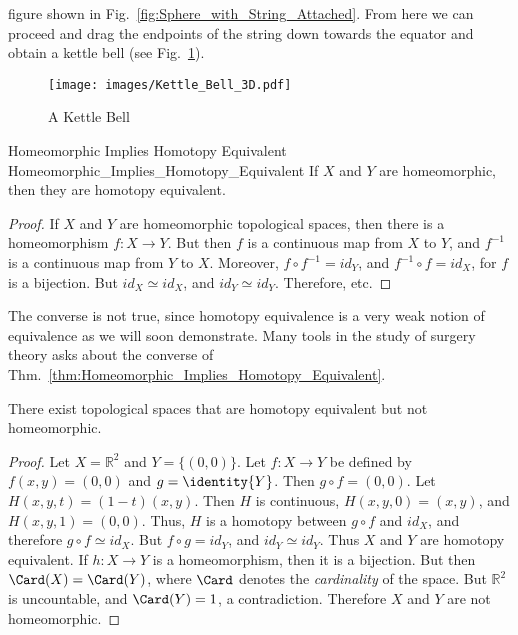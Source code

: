 \documentclass{article}                                                        %
\begin{document}
        figure shown in Fig.~\ref{fig:Sphere_with_String_Attached}. From here we
        can proceed and drag the endpoints of the string down towards the
        equator and obtain a kettle bell (see Fig.~\ref{fig:Kettle_Bell}).
        \begin{figure}[H]
            \centering
            \captionsetup{type=figure}
            \texttt{[image: images/Kettle\_Bell\_3D.pdf]}
            \caption{A Kettle Bell}
            \label{fig:Kettle_Bell}
        \end{figure}
        \clearpage
        \begin{ltheorem}{Homeomorphic Implies Homotopy Equivalent}
                        {Homeomorphic_Implies_Homotopy_Equivalent}
            If $X$ and $Y$ are homeomorphic, then they are homotopy equivalent.
        \end{ltheorem}
        \begin{proof}
            If $X$ and $Y$ are homeomorphic topological spaces, then there
            is a homeomorphism $f:X\rightarrow Y$. But then $f$ is a
            continuous map from $X$ to $Y$, and $f^{-1}$ is a continuous
            map from $Y$ to $X$. Moreover, ${f}\circ{f^{-1}}=id_{Y}$, and
            ${f^{-1}}\circ{f}=id_{X}$, for $f$ is a bijection. But
            ${id_{X}}\simeq{id_{X}}$, and ${id_{Y}}\simeq{id_{Y}}$.
            Therefore, etc.
        \end{proof}
        The converse is not true, since homotopy equivalence is a very weak
        notion of equivalence as we will soon demonstrate. Many tools in the
        study of surgery theory asks about the converse of
        Thm.~\ref{thm:Homeomorphic_Implies_Homotopy_Equivalent}.
        \begin{theorem}
            \label{thm:homotopic_does_not_imply_homeomorphic}%
            There exist topological spaces that are homotopy equivalent but not
            homeomorphic.
        \end{theorem}
        \begin{proof}
            Let $X=\mathbb{R}^{2}$ and $Y=\{(0,0)\}$. Let $f:{X}\rightarrow{Y}$
            be defined by $f(x,y)=(0,0)$ and $g=\identity{Y}$. Then
            $g\circ{f}=(0,0)$. Let $H(x,y,t)=(1-t)(x,y)$.
            Then $H$ is continuous, $H(x,y,0)=(x,y)$,
            and $H(x,y,1)=(0,0)$. Thus, $H$ is a
            homotopy between ${g}\circ{f}$ and $id_{X}$, and
            therefore ${g}\circ{f}\simeq{id_{X}}$. But
            ${f}\circ{g}=id_{Y}$, and ${id_{Y}}\simeq{id_{Y}}$.
            Thus $X$ and $Y$ are homotopy equivalent.
            If $h:{X}\rightarrow{Y}$ is a homeomorphism, then it is a
            bijection. But then $\Card(X)=\Card(Y)$,
            where $\Card$ denotes the \textit{cardinality} of the space.
            But $\mathbb{R}^{2}$ is uncountable, and $\Card(Y)=1$,
            a contradiction. Therefore $X$ and $Y$ are not homeomorphic.
        \end{proof}
\end{document}
